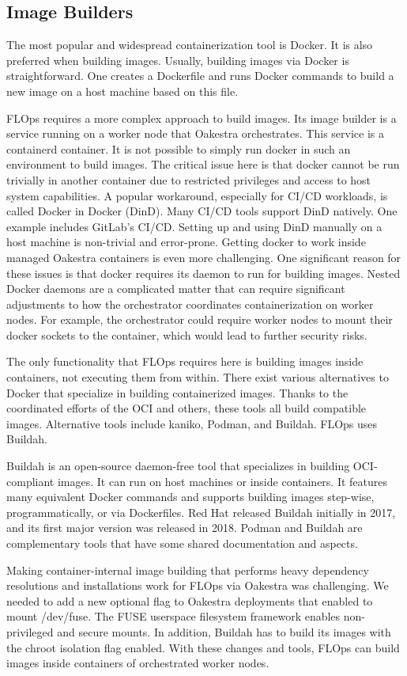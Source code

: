 \subsection{Image Builders}

The most popular and widespread containerization tool is Docker.
It is also preferred when building images.
Usually, building images via Docker is straightforward.
One creates a Dockerfile and runs Docker commands to build a new image on a host machine based on this file.

FLOps requires a more complex approach to build images.
Its image builder is a service running on a worker node that Oakestra orchestrates.
This service is a containerd container.
It is not possible to simply run docker in such an environment to build images.
The critical issue here is that docker cannot be run trivially in another container due to restricted privileges and access to host system capabilities.
A popular workaround, especially for CI/CD workloads, is called Docker in Docker (DinD).
Many CI/CD tools support DinD natively.
One example includes GitLab's CI/CD.
Setting up and using DinD manually on a host machine is non-trivial and error-prone.
Getting docker to work inside managed Oakestra containers is even more challenging.
One significant reason for these issues is that docker requires its daemon to run for building images.
Nested Docker daemons are a complicated matter that can require significant adjustments to how the orchestrator coordinates containerization on worker nodes.
For example, the orchestrator could require worker nodes to mount their docker sockets to the container, which would lead to further security risks.

The only functionality that FLOps requires here is building images inside containers, not executing them from within.
There exist various alternatives to Docker that specialize in building containerized images.
Thanks to the coordinated efforts of the OCI and others, these tools all build compatible images.
Alternative tools include kaniko, Podman, and Buildah.
FLOps uses Buildah.

Buildah is an open-source daemon-free tool that specializes in building OCI-compliant images.
It can run on host machines or inside containers.
It features many equivalent Docker commands and supports building images step-wise, programmatically, or via Dockerfiles.
Red Hat released Buildah initially in 2017, and its first major version was released in 2018.
Podman and Buildah are complementary tools that have some shared documentation and aspects.

Making container-internal image building that performs heavy dependency resolutions and installations work for FLOps via Oakestra was challenging.
We needed to add a new optional flag to Oakestra deployments that enabled to mount /dev/fuse.
The FUSE userspace filesystem framework enables non-privileged and secure mounts.
In addition, Buildah has to build its images with the chroot isolation flag enabled.
With these changes and tools, FLOps can build images inside containers of orchestrated worker nodes.